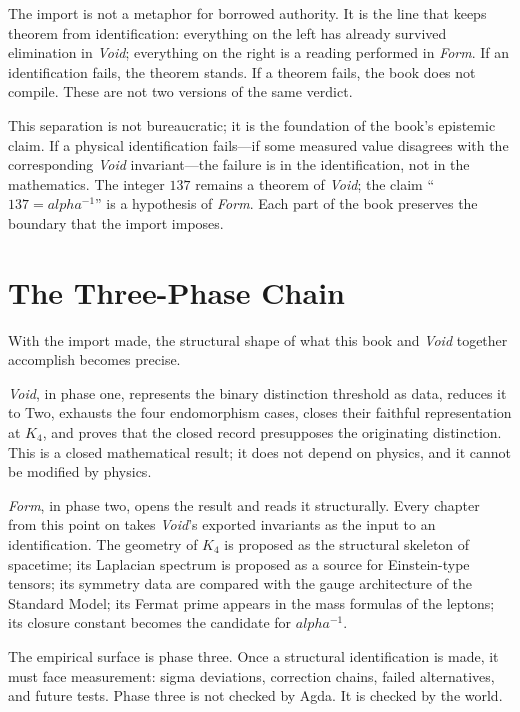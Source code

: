 \documentclass[11pt,a4paper]{book}
\def\alpha{alpha}%
\def\texttt#1{#1}%
\begin{document}
The import is not a metaphor for borrowed authority. It is the line that keeps theorem from identification: everything on the left has already survived elimination in \textit{Void}; everything on the right is a reading performed in \textit{Form}. If an identification fails, the theorem stands. If a theorem fails, the book does not compile. These are not two versions of the same verdict.

This separation is not bureaucratic; it is the foundation of the book's epistemic claim. If a physical identification fails---if some measured value disagrees with the corresponding \textit{Void} invariant---the failure is in the identification, not in the mathematics. The integer $137$ remains a theorem of \textit{Void}; the claim ``$137 = \alpha^{-1}$'' is a hypothesis of \textit{Form}. Each part of the book preserves the boundary that the import imposes.

\section*{The Three-Phase Chain}

With the import made, the structural shape of what this book and \textit{Void} together accomplish becomes precise.

\textit{Void}, in phase one, represents the binary distinction threshold as data, reduces it to \texttt{Two}, exhausts the four endomorphism cases, closes their faithful representation at $K_4$, and proves that the closed record presupposes the originating distinction. This is a closed mathematical result; it does not depend on physics, and it cannot be modified by physics.

\textit{Form}, in phase two, opens the result and reads it structurally. Every chapter from this point on takes \textit{Void}'s exported invariants as the input to an identification. The geometry of $K_4$ is proposed as the structural skeleton of spacetime; its Laplacian spectrum is proposed as a source for Einstein-type tensors; its symmetry data are compared with the gauge architecture of the Standard Model; its Fermat prime appears in the mass formulas of the leptons; its closure constant becomes the candidate for $\alpha^{-1}$.

The empirical surface is phase three. Once a structural identification is made, it must face measurement: sigma deviations, correction chains, failed alternatives, and future tests. Phase three is not checked by Agda. It is checked by the world.
\end{document}
